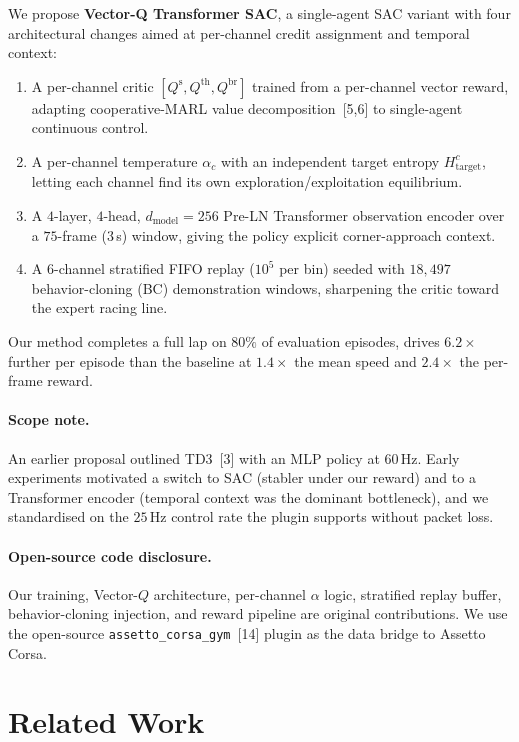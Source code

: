\documentclass{article}
\begin{document}
We propose \textbf{Vector-Q Transformer SAC}, a single-agent SAC
variant with four architectural changes aimed at per-channel credit
assignment and temporal context:
\begin{enumerate}
  \item A per-channel critic $[Q^{\mathrm{s}}, Q^{\mathrm{th}}, Q^{\mathrm{br}}]$
  trained from a per-channel vector reward, adapting cooperative-MARL
  value decomposition~[5,6] to single-agent continuous control.
  \item A per-channel temperature $\alpha_c$ with an independent
  target entropy $H^c_{\text{target}}$, letting each channel find its
  own exploration/exploitation equilibrium.
  \item A $4$-layer, $4$-head, $d_{\text{model}}{=}256$ Pre-LN
  Transformer observation encoder over a $75$-frame ($3$\,s) window,
  giving the policy explicit corner-approach context.
  \item A $6$-channel stratified FIFO replay ($10^5$ per bin) seeded
  with $18{,}497$ behavior-cloning (BC) demonstration windows,
  sharpening the critic toward the expert racing line.
\end{enumerate}

Our method completes a full lap on $80\%$ of evaluation episodes,
drives $6.2\times$ further per episode than the baseline at
$1.4\times$ the mean speed and $2.4\times$ the per-frame reward.

\paragraph{Scope note.}
An earlier proposal outlined TD3~[3] with an MLP policy at $60$\,Hz.
Early experiments motivated a switch to SAC (stabler under our
reward) and to a Transformer encoder (temporal context was the
dominant bottleneck), and we standardised on the $25$\,Hz control
rate the plugin supports without packet loss.

\paragraph{Open-source code disclosure.}
Our training, Vector-$Q$ architecture, per-channel $\alpha$ logic,
stratified replay buffer, behavior-cloning injection, and reward
pipeline are original contributions. We use the open-source
\texttt{assetto\_corsa\_gym}~[14] plugin as the data bridge to
Assetto Corsa.

\section{Related Work}
\label{sec:related}
\end{document}
